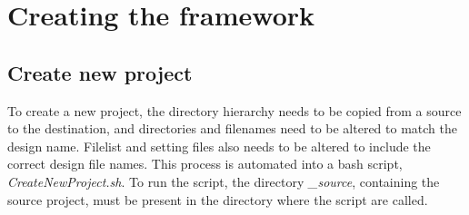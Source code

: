 \chapter{\label{chp:createframework}Creating the framework}
\section{Create new project}
To create a new project, the directory hierarchy needs to be copied from a source to the destination, and directories and filenames need to be altered to match the design name. Filelist and setting files also needs to be altered to include the correct design file names. This process is automated into a bash script, \textit{CreateNewProject.sh}. To run the script, the directory \textit{\_source}, containing the source project, must be present in the directory where the script are called.

